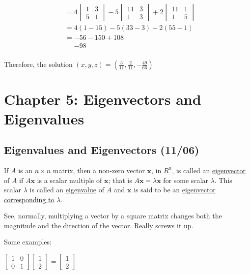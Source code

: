 \documentclass[
  letterpaper,
  DIV=11,
  numbers=noendperiod]{scrartcl}
\begin{document}
\begin{align*}
&= 4\begin{vmatrix}1 & 3 \\ 5 & 1\end{vmatrix}-5\begin{vmatrix}11 & 3 \\ 1 & 3\end{vmatrix}+2\begin{vmatrix}11 & 1 \\ 1 & 5\end{vmatrix} \\
&= 4(1-15)-5(33-3)+2(55-1) \\
&= -56-150+108 \\
&= -98 \\
\end{align*}

Therefore, the solution
\((x, y, z) = (\frac{3}{11}, \frac{2}{11}, -\frac{49}{66})\)

\newpage{}

\section{Chapter 5: Eigenvectors and
Eigenvalues}\label{chapter-5-eigenvectors-and-eigenvalues}

\subsection{Eigenvalues and Eigenvectors
(11/06)}\label{eigenvalues-and-eigenvectors-1106}

If \(A\) is an \(n \times n\) matrix, then a non-zero vector
\(\symbf{x}\), in \(R^n\), is called an \ul{eigenvector} of \(A\) if
\(A\symbf{x}\) is a scalar multiple of \(\symbf{x}\); that is
\(A\symbf{x} = \lambda\symbf{x}\) for some scalar \(\lambda\). This
scalar \(\lambda\) is called an \ul{eigenvalue} of \(A\) and
\(\symbf{x}\) is said to be an \ul{eigenvector corresponding to}
\(\lambda\).

See, normally, multiplying a vector by a square matrix changes both the
magnitude and the direction of the vector. Really screws it up.

Some examples:

\(\begin{bmatrix}1 & 0 \\ 0 & 1\end{bmatrix}\begin{bmatrix}1 \\ 2\end{bmatrix}=\begin{bmatrix}1 \\ 2\end{bmatrix}\)
\end{document}
